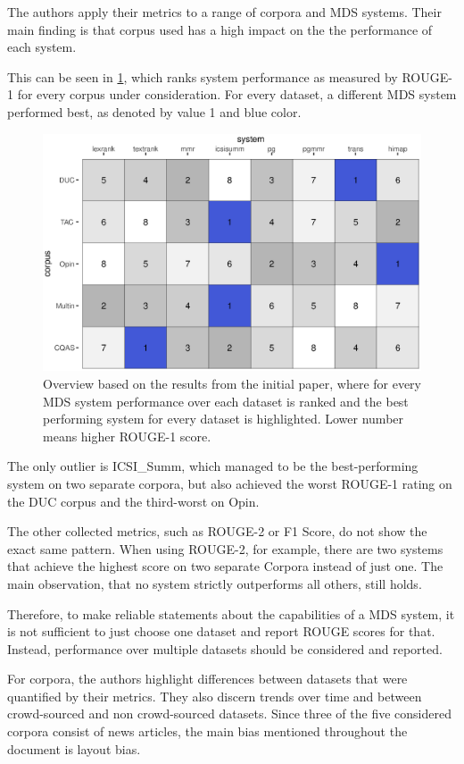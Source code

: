 \documentclass[20_original-paper.tex]{subfiles}
\begin{document}
The authors apply their metrics to a range of corpora and MDS systems. Their main finding is that corpus used has a high impact on the the performance of each system.

This can be seen in \ref{results}, which ranks system performance as measured by ROUGE-1 for every corpus under consideration. For every dataset, a different MDS system performed best, as denoted by value 1 and blue color.


\begin{figure}
    \includegraphics[width=\textwidth]{figures/results.eps}
    \caption{Overview based on the results from the initial paper, where for every MDS system performance over each dataset is ranked and the best performing system for every dataset is highlighted. Lower number means higher ROUGE-1 score.} \label{results}
\end{figure}


The only outlier is ICSI\_Summ, which managed to be the best-performing system on two separate corpora, but also achieved the worst ROUGE-1 rating on the DUC corpus and the third-worst on Opin.


The other collected metrics, such as ROUGE-2 or F1 Score, do not show the exact same pattern.
When using ROUGE-2, for example, there are two systems that achieve the highest score on two separate Corpora instead of just one.
The main observation, that no system strictly outperforms all others, still holds.

Therefore, to make reliable statements about the capabilities of a MDS system,
it is not sufficient to just choose one dataset and report ROUGE scores for that.
Instead, performance over multiple datasets should be considered and reported.

For corpora, the authors highlight differences between datasets that were quantified by their metrics.
They also discern trends over time and between crowd-sourced and non crowd-sourced datasets.
Since three of the five considered corpora consist of news articles, the main bias mentioned throughout the document is layout bias.
\end{document}
